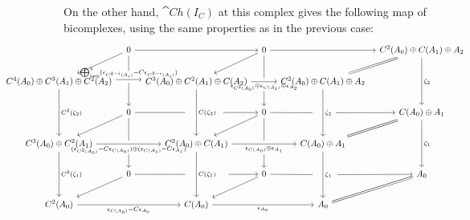 \vspace{10pt}

On the other hand, $\cat{Ch}(I_C)$ at this complex gives the following map of bicomplexes, using the same properties as in the previous case:
\[\hspace{-70pt}\begin{tikzcd}[column sep=8pt]
	& 0 && 0 && {C^2(A_0)\oplus C(A_1)\oplus A_2} \\
	{C^4(A_0)\oplus C^3(A_1)\oplus C^2(A_2)} && {C^3(A_0)\oplus C^2(A_1)\oplus C(A_2)} && {C^2(A_0)\oplus C(A_1)\oplus A_2} \\
	& 0 && 0 && {C(A_0)\oplus A_1} \\
	{C^3(A_0)\oplus C^2(A_1)} && {C^2(A_0)\oplus C(A_1)} && {C(A_0)\oplus A_1} \\
	& 0 && 0 && {A_0} \\
	{C^2(A_0)} && {C(A_0)} && {A_0}
	\arrow["{\zeta_2}", from=1-6, to=3-6]
	\arrow["{\zeta_1}", from=3-6, to=5-6]
	\arrow["{\epsilon_{C(A_0)}-C\epsilon_{A_0}}"', from=6-1, to=6-3]
	\arrow["{\epsilon_{A_0}}"', from=6-3, to=6-5]
	\arrow[Rightarrow, no head, from=5-6, to=6-5]
	\arrow[""{name=0, anchor=center, inner sep=0}, "{(\epsilon_{C^2(A_0)}-C\epsilon_{C(A_0)})\oplus (\epsilon_{C(A_1)}-C\epsilon_{A_1})}"', from=4-1, to=4-3]
	\arrow[""{name=1, anchor=center, inner sep=0}, "{\epsilon_{C(A_0)}\oplus \epsilon_{A_1}}"', from=4-3, to=4-5]
	\arrow[from=1-2, to=1-4]
	\arrow[from=1-4, to=1-6]
	\arrow[Rightarrow, no head, from=1-6, to=2-5]
	\arrow[Rightarrow, no head, from=3-6, to=4-5]
	\arrow[from=1-4, to=2-3]
	\arrow[from=1-2, to=2-1]
	\arrow[""{name=2, anchor=center, inner sep=0}, "{\epsilon_{C^2(A_0)}\oplus \epsilon_{C(A_1)}\oplus \epsilon_{A_2}}"', from=2-3, to=2-5]
	\arrow[""{name=3, anchor=center, inner sep=0}, "{\bigoplus_{i=0}^3(\epsilon_{C^{4-i}(A_i)}-C\epsilon_{C^{3-i}(A_i)})}", shift left, from=2-1, to=2-3]
	\arrow[""{name=4, anchor=center, inner sep=0}, "{\zeta_1}", from=4-5, to=6-5]
	\arrow[""{name=5, anchor=center, inner sep=0}, "{\zeta_2}", from=2-5, to=4-5]
	\arrow[""{name=6, anchor=center, inner sep=0}, "{C(\zeta_1)}", from=4-3, to=6-3]
	\arrow[""{name=7, anchor=center, inner sep=0}, "{C(\zeta_2)}", from=2-3, to=4-3]
	\arrow["{C^2(\zeta_2)}", from=2-1, to=4-1]
	\arrow["{C^2(\zeta_1)}", from=4-1, to=6-1]
	\arrow[from=5-2, to=6-1]
	\arrow[from=3-2, to=4-1]
	\arrow[from=3-4, to=4-3]
	\arrow[from=5-4, to=6-3]
	\arrow[shorten >=9pt, no head, from=1-2, to=3]
	\arrow[shorten <=3pt, from=3, to=3-2]
	\arrow[shorten >=3pt, no head, from=3-2, to=0]
	\arrow[shorten <=11pt, from=0, to=5-2]
	\arrow[shorten >=12pt, no head, from=5-2, to=6]
	\arrow[shorten <=36pt, from=6, to=5-4]
	\arrow[shorten >=11pt, no head, from=5-4, to=4]
	\arrow[shorten <=16pt, from=4, to=5-6]
	\arrow[shorten <=14pt, from=5, to=3-6]
	\arrow[shorten >=11pt, no head, from=3-4, to=5]
	\arrow[shorten <=30pt, from=7, to=3-4]
	\arrow[shorten >=12pt, no head, from=3-2, to=7]
	\arrow[shorten >=3pt, no head, from=1-4, to=2]
	\arrow[shorten <=10pt, from=2, to=3-4]
	\arrow[shorten >=3pt, no head, from=3-4, to=1]
	\arrow[shorten <=11pt, from=1, to=5-4]
\end{tikzcd}\]
